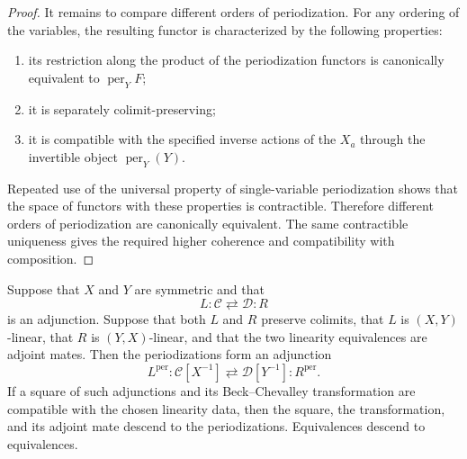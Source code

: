 \begin{proof}
It remains to compare different orders of periodization.  For any ordering
of the variables, the resulting functor is characterized by the following
properties:

\begin{enumerate}
    \item its restriction along the product of the periodization functors is
    canonically equivalent to \(\operatorname{per}_YF\);

    \item it is separately colimit-preserving;

    \item it is compatible with the specified inverse actions of the
    \(X_a\) through the invertible object \(\operatorname{per}_Y(Y)\).
\end{enumerate}

Repeated use of the universal property of single-variable periodization shows
that the space of functors with these properties is contractible.  Therefore
different orders of periodization are canonically equivalent.  The same
contractible uniqueness gives the required higher coherence and compatibility
with composition.
\end{proof}

\begin{proposition}
\label{prop:periodized-adjunction}
Suppose that $X$ and $Y$ are symmetric and that
\[
    L:\mathcal C\rightleftarrows\mathcal D:R
\]
is an adjunction.  Suppose that both $L$ and $R$ preserve colimits, that $L$ is $(X,Y)$-linear, that
$R$ is $(Y,X)$-linear, and that the two linearity equivalences are adjoint mates.  Then the
periodizations form an adjunction
\[
    L^{\mathrm{per}}:
    \mathcal C[X^{-1}]
    \rightleftarrows
    \mathcal D[Y^{-1}]:R^{\mathrm{per}}.
\]
If a square of such adjunctions and its Beck--Chevalley transformation are compatible with the
chosen linearity data, then the square, the transformation, and its adjoint mate descend to the
periodizations.  Equivalences descend to equivalences.
\end{proposition}

